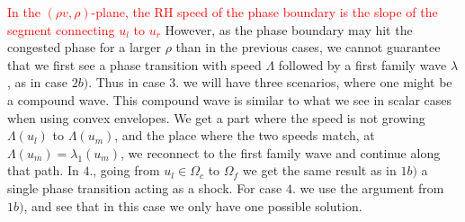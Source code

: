 \documentclass[10pt]{article}
\numberwithin{equation}{section}
\begin{document}
\textcolor{red}{In the $(\rho v, \rho)$-plane, the RH speed of the phase boundary is the slope of the segment connecting $u_l$ to $u_r$}
However, as the phase boundary may hit the congested phase for a larger $\rho$ than in the previous cases, we cannot guarantee that we first see a phase transition with speed $\Lambda$ followed by a first family wave $\lambda$, as in case $2b)$. Thus in case $3.$ we will have three scenarios, where one might be a compound wave. This compound wave is similar to what we see in scalar cases when using convex envelopes. We get a part where the speed is not growing $\Lambda(u_l)$ to $\Lambda(u_m)$, and the place where the two speeds match, at $\Lambda(u_m) = \lambda_1(u_m)$, we reconnect to the first family wave and continue along that path.  In $4.$, going from $u_l \in \Omega_c$ to $\Omega_f$ we get the same result as in $1b)$ a single phase transition acting as a shock. For case $4.$ we use the argument from $1b)$, and see that in this case we only have one possible solution.
   
\end{document}
